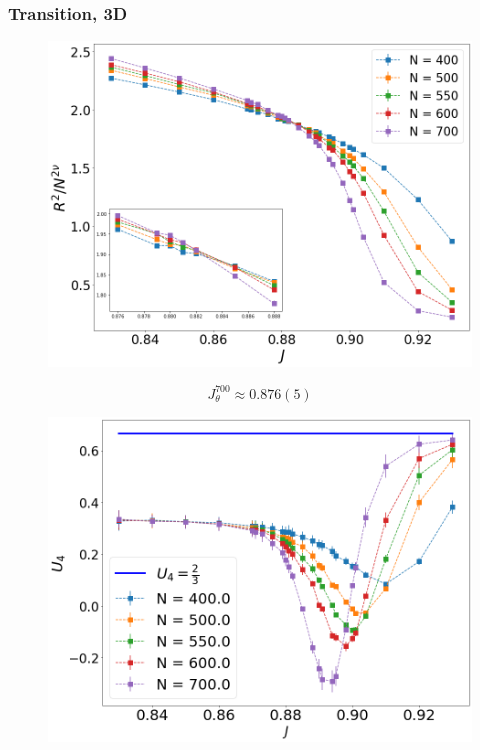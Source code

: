 \documentclass{beamer}
\begin{document}
\begin{frame}
	\frametitle{Transition, 3D}
	\begin{multicols}{2}	
		\begin{figure}[h]
			\centering
			\includegraphics[scale=0.1822]{3_rscaling_longchains.png} 
			\label{ph}
		\end{figure}
		\begin{equation*}
		\label{eq:critical_J_theta_2D}
		J_{\theta}^{700} \approx 0.876(5)     
		\end{equation*}		
		\columnbreak		
		\begin{figure}[h]
			\centering
			\includegraphics[scale=0.1822 ]{3_bindercumulants_longchains.png} 
			\label{ph}
		\end{figure}
	\end{multicols}
\end{frame}
\end{document}
